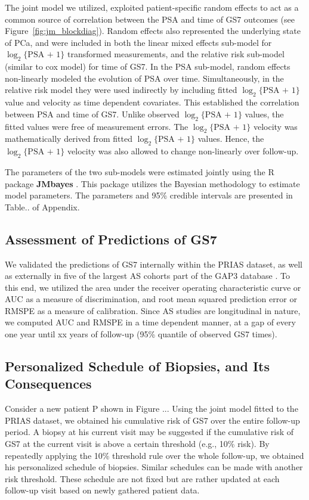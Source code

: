 The joint model we utilized, exploited patient-specific random effects \citep{laird1982random} to act as a common source of correlation between the PSA and time of GS7 outcomes (see Figure~\ref{fig:jm_blockdiag}). Random effects also represented the underlying state of PCa, and were included in both the linear mixed effects sub-model for $\log_2\{\mbox{PSA + 1}\}$ transformed measurements, and the relative risk sub-model (similar to cox model) for time of GS7. In the PSA sub-model, random effects non-linearly modeled the evolution of PSA over time. Simultaneously, in the relative risk model they were used indirectly by including fitted $\log_2\{\mbox{PSA + 1}\}$ value and velocity as time dependent covariates. This established the correlation between PSA and time of GS7. Unlike observed $\log_2\{\mbox{PSA + 1}\}$ values, the fitted values were free of measurement errors. The $\log_2\{\mbox{PSA + 1}\}$ velocity was mathematically derived from fitted $\log_2\{\mbox{PSA + 1}\}$ values. Hence, the $\log_2\{\mbox{PSA + 1}\}$ velocity was also allowed to change non-linearly over follow-up.

The parameters of the two sub-models were estimated jointly using the R package \textbf{JMbayes} \citep{rizopoulosJMbayes}. This package utilizes the Bayesian methodology to estimate model parameters. The parameters and 95\% credible intervals are presented in Table.. of Appendix.

\subsection{Assessment of Predictions of GS7}
We validated the predictions of GS7 internally within the PRIAS dataset, as well as externally in five of the largest AS cohorts part of the GAP3 database \citep{gap3_2018}. To this end, we utilized the area under the receiver operating characteristic curve or AUC \cite{rizopoulos2017dynamic} as a measure of discrimination, and root mean squared prediction error or RMSPE \cite{rizopoulos2017dynamic} as a measure of calibration. Since AS studies are longitudinal in nature, we computed AUC and RMSPE in a time dependent manner, at a gap of every one year until xx years of follow-up (95\% quantile of observed GS7 times).

\subsection{Personalized Schedule of Biopsies, and Its Consequences}
Consider a new patient P shown in Figure ... Using the joint model fitted to the PRIAS dataset, we obtained his cumulative risk of GS7 over the entire follow-up period. A biopsy at his current visit may be suggested if the cumulative risk of GS7 at the current visit is above a certain threshold (e.g., 10\% risk). By repeatedly applying the 10\% threshold rule over the whole follow-up, we obtained his personalized schedule of biopsies. Similar schedules can be made with another risk threshold. These schedule are not fixed but are rather updated at each follow-up visit based on newly gathered patient data. 

